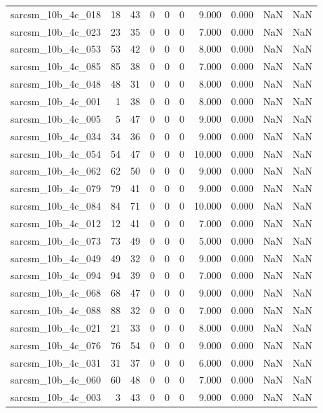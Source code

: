 \documentclass{article}
\begin{document}
\begin{longtable}{lrrrrrrrrr}
sarcsm\_10b\_4c\_018 & 18 & 43 & 0 & 0 & 0 & 9.000 & 0.000 & NaN & NaN \\
sarcsm\_10b\_4c\_023 & 23 & 35 & 0 & 0 & 0 & 7.000 & 0.000 & NaN & NaN \\
sarcsm\_10b\_4c\_053 & 53 & 42 & 0 & 0 & 0 & 8.000 & 0.000 & NaN & NaN \\
sarcsm\_10b\_4c\_085 & 85 & 38 & 0 & 0 & 0 & 7.000 & 0.000 & NaN & NaN \\
sarcsm\_10b\_4c\_048 & 48 & 31 & 0 & 0 & 0 & 8.000 & 0.000 & NaN & NaN \\
sarcsm\_10b\_4c\_001 & 1 & 38 & 0 & 0 & 0 & 8.000 & 0.000 & NaN & NaN \\
sarcsm\_10b\_4c\_005 & 5 & 47 & 0 & 0 & 0 & 9.000 & 0.000 & NaN & NaN \\
sarcsm\_10b\_4c\_034 & 34 & 36 & 0 & 0 & 0 & 9.000 & 0.000 & NaN & NaN \\
sarcsm\_10b\_4c\_054 & 54 & 47 & 0 & 0 & 0 & 10.000 & 0.000 & NaN & NaN \\
sarcsm\_10b\_4c\_062 & 62 & 50 & 0 & 0 & 0 & 9.000 & 0.000 & NaN & NaN \\
sarcsm\_10b\_4c\_079 & 79 & 41 & 0 & 0 & 0 & 9.000 & 0.000 & NaN & NaN \\
sarcsm\_10b\_4c\_084 & 84 & 71 & 0 & 0 & 0 & 10.000 & 0.000 & NaN & NaN \\
sarcsm\_10b\_4c\_012 & 12 & 41 & 0 & 0 & 0 & 7.000 & 0.000 & NaN & NaN \\
sarcsm\_10b\_4c\_073 & 73 & 49 & 0 & 0 & 0 & 5.000 & 0.000 & NaN & NaN \\
sarcsm\_10b\_4c\_049 & 49 & 32 & 0 & 0 & 0 & 9.000 & 0.000 & NaN & NaN \\
sarcsm\_10b\_4c\_094 & 94 & 39 & 0 & 0 & 0 & 7.000 & 0.000 & NaN & NaN \\
sarcsm\_10b\_4c\_068 & 68 & 47 & 0 & 0 & 0 & 9.000 & 0.000 & NaN & NaN \\
sarcsm\_10b\_4c\_088 & 88 & 32 & 0 & 0 & 0 & 7.000 & 0.000 & NaN & NaN \\
sarcsm\_10b\_4c\_021 & 21 & 33 & 0 & 0 & 0 & 8.000 & 0.000 & NaN & NaN \\
sarcsm\_10b\_4c\_076 & 76 & 54 & 0 & 0 & 0 & 9.000 & 0.000 & NaN & NaN \\
sarcsm\_10b\_4c\_031 & 31 & 37 & 0 & 0 & 0 & 6.000 & 0.000 & NaN & NaN \\
sarcsm\_10b\_4c\_060 & 60 & 48 & 0 & 0 & 0 & 7.000 & 0.000 & NaN & NaN \\
sarcsm\_10b\_4c\_003 & 3 & 43 & 0 & 0 & 0 & 9.000 & 0.000 & NaN & NaN \\

\end{longtable}
\end{document}
